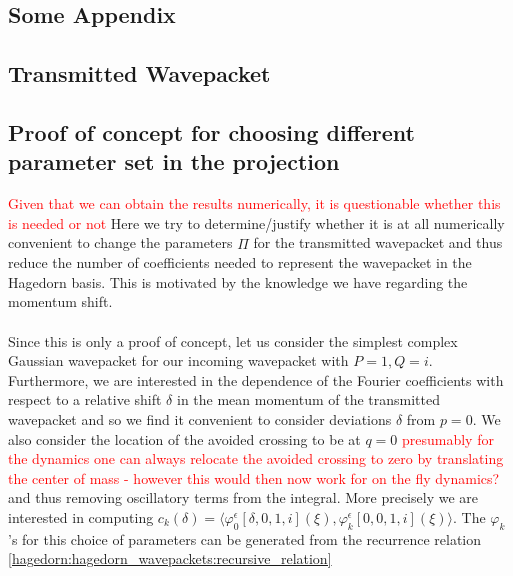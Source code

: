 \documentclass[12pt]{article}
\numberwithin{equation}{section}
\begin{document}
  \clear
  \newpage
  \printbibliography
  \begin{appendices}
  \chapter{Some Appendix}
  \section{Transmitted Wavepacket}
    
\section{Proof of concept for choosing different parameter set in the 
        projection}
\textcolor{red}{Given that we can obtain the results numerically, 
it is questionable whether this is needed or not}
Here we try to determine/justify whether it is at all 
numerically convenient to change the parameters $\hat{\Pi}$ 
for the transmitted wavepacket and thus reduce the number 
of coefficients needed to represent the wavepacket in the 
Hagedorn basis. This is motivated by the knowledge we have 
regarding the momentum shift.
\\
\\
Since this is only a proof of concept, let us consider the 
simplest complex Gaussian wavepacket for our incoming 
wavepacket with $P = 1, Q = i$. 
Furthermore, we are interested in the dependence of the 
Fourier coefficients with respect to a relative shift $\delta$
in the mean momentum of the transmitted wavepacket and so we 
find it convenient to consider deviations $\delta$ from 
$p = 0$. We also consider the location 
of the avoided crossing to be at $q=0$ 
\textcolor{red}{presumably for the dynamics one can always 
  relocate the avoided crossing to zero by translating the center of mass 
- however this would then now work for on the fly dynamics?}
and thus removing oscillatory terms from the integral.
More precisely we are interested in computing 
$c_k(\delta) = \langle \varphi_0^\epsilon[\delta,0,1,i](\xi),
\varphi_k^\epsilon[0,0,1,i](\xi)  \rangle$. The $\varphi_k$'s 
for this choice of parameters can be generated from the 
recurrence relation
\eqref{hagedorn:hagedorn_wavepackets:recursive_relation}

\end{appendices}
\end{document}
